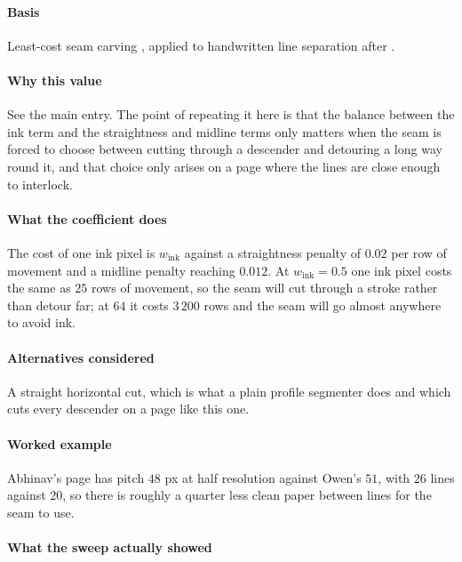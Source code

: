 \paragraph{Basis}

Least-cost seam carving \cite[10:3]{avidan2007}, applied to handwritten line separation after \cite{arvanitopoulos2014}.

\paragraph{Why this value}

See the main entry. The point of repeating it here is that the balance between the ink term and the straightness and midline terms only matters when the seam is forced to choose between cutting through a descender and detouring a long way round it, and that choice only arises on a page where the lines are close enough to interlock.

\paragraph{What the coefficient does}

The cost of one ink pixel is $w_{\text{ink}}$ against a straightness penalty of $0.02$ per row of movement and a midline penalty reaching $0.012$. At $w_{\text{ink}} = 0.5$ one ink pixel costs the same as $25$ rows of movement, so the seam will cut through a stroke rather than detour far; at $64$ it costs $3\,200$ rows and the seam will go almost anywhere to avoid ink.

\paragraph{Alternatives considered}

A straight horizontal cut, which is what a plain profile segmenter does and which cuts every descender on a page like this one.

\paragraph{Worked example}

Abhinav's page has pitch $48$ px at half resolution against Owen's $51$, with $26$ lines against $20$, so there is roughly a quarter less clean paper between lines for the seam to use.

\paragraph{What the sweep actually showed}

